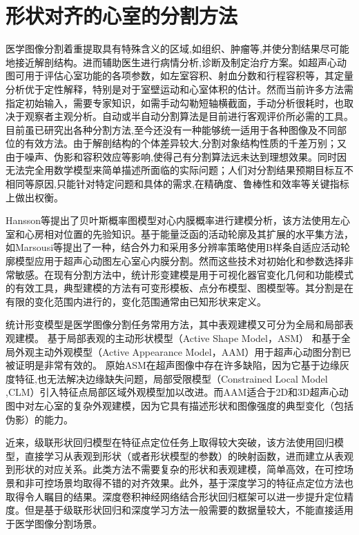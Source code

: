 \section{形状对齐的心室的分割方法}
\label{sec:Segmentation}
 
医学图像分割着重提取具有特殊含义的区域,如组织、肿瘤等,并使分割结果尽可能地接近解剖结构。进而辅助医生进行病情分析,诊断及制定治疗方案。如超声心动图可用于评估心室功能的各项参数，如左室容积、射血分数和行程容积等，其定量分析优于定性解释，特别是对于室壁运动和心室体积的估计。然而当前许多方法需指定初始输入，需要专家知识，如需手动勾勒短轴横截面，手动分析很耗时，也取决于观察者主观分析。自动或半自动分割算法是目前进行客观评价所必需的工具。目前虽已研究出各种分割方法,至今还没有一种能够统一适用于各种图像及不同部位的有效方法。由于解剖结构的个体差异较大,分割对象结构性质的千差万别；又由于噪声、伪影和容积效应等影响,使得己有分割算法远未达到理想效果。同时因无法完全用数学模型来简单描述所面临的实际问题；人们对分割结果预期目标互不相同等原因,只能针对特定问题和具体的需求,在精确度、鲁棒性和效率等关键指标上做出权衡\citep{Bosch2002}。

Hansson等\citep{Hansson2014}提出了贝叶斯概率图模型对心内膜概率进行建模分析，该方法使用左心室和心房相对位置的先验知识。基于能量泛函的活动轮廓及其扩展的水平集方法，如Marsousi等\citep{Marsousi2010}提出了一种，结合外力和采用多分辨率策略使用B样条自适应活动轮廓模型应用于超声心动图左心室心内膜分割。然而这些技术对初始化和参数选择非常敏感。在现有分割方法中，统计形变建模是用于可视化器官变化几何和功能模式的有效工具\citep{Santiago2016}，典型建模的方法有可变形模板、点分布模型、图模型等。其分割是在有限的变化范围内进行的，变化范围通常由已知形状来定义。

统计形变模型是医学图像分割任务常用方法，其中表观建模又可分为全局和局部表观建模。
基于局部表观的主动形状模型（Active Shape Model，ASM）\citep{Cootes1995a} 和基于全局外观主动外观模型（Active Appearance Model，AAM）\citep{Cootes2001}用于超声心动图分割已被证明是非常有效的\citep{Bosch2002,Mitchell2002,Vargas-Quintero2016}。
原始ASM在超声图像中存在许多缺陷\citep{Santiago2016}，因为它基于边缘灰度特征,也无法解决边缘缺失问题，局部受限模型\citep{Cristinacce2008a}（Constrained Local Model ,CLM）引入特征点局部区域外观模型加以改进。而AAM适合于2D和3D超声心动图中对左心室的复杂外观建模，因为它具有描述形状和图像强度的典型变化（包括伪影）的能力\citep{VanStralen2015}。

近来，级联形状回归模型\citep{Kazemi2014a}在特征点定位任务上取得较大突破，该方法使用回归模型，直接学习从表观到形状（或者形状模型的参数）的映射函数，进而建立从表观到形状的对应关系。此类方法不需要复杂的形状和表观建模，简单高效，在可控场景和非可控场景均取得不错的对齐效果。此外，基于深度学习的特征点定位方法\citep{Trigeorgis2016}也取得令人瞩目的结果。深度卷积神经网络结合形状回归框架可以进一步提升定位精度。但是基于级联形状回归和深度学习方法一般需要的数据量较大，不能直接适用于医学图像分割场景。

